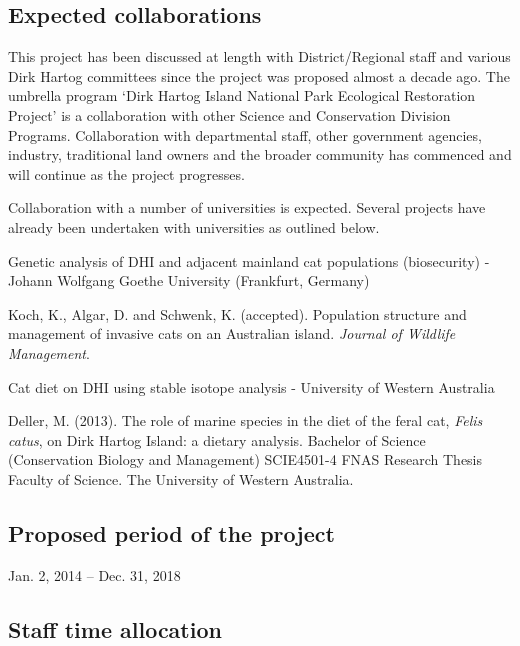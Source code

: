 \documentclass[version=last,
    paper=a4,                               %
    10pt,                                   %
    dvipsnames,
    oneside,                              %
    headings=openany,                       %
    open=any,
    BCOR=7mm,                               %
    DIV=15,     %
]{scrbook}
\begin{document}
\subsection*{Expected collaborations}

This project has been discussed at length with District/Regional staff
and various Dirk Hartog committees since the project was proposed almost
a decade ago. The umbrella program `Dirk Hartog Island National Park
Ecological Restoration Project' is a collaboration with other Science
and Conservation Division Programs. Collaboration with departmental
staff, other government agencies, industry, traditional land owners and
the broader community has commenced and will continue as the project
progresses.

Collaboration with a number of universities is expected. Several
projects have already been undertaken with universities as outlined
below.

Genetic analysis of DHI and adjacent mainland cat populations
(biosecurity) - Johann Wolfgang Goethe University (Frankfurt, Germany)

Koch, K., Algar, D. and Schwenk, K. (accepted). Population structure and
management of invasive cats on an Australian island. \emph{Journal of
Wildlife Management}.

Cat diet on DHI using stable isotope analysis - University of Western
Australia

Deller, M. (2013). The role of marine species in the diet of the feral
cat, \emph{Felis catus}, on Dirk Hartog Island: a dietary analysis.
Bachelor of Science (Conservation Biology and Management) SCIE4501-4
FNAS Research Thesis Faculty of Science. The University of Western
Australia.


\subsection*{Proposed period of the project}
Jan. 2, 2014 -- Dec. 31, 2018



\subsection*{Staff time allocation }
\end{document}
